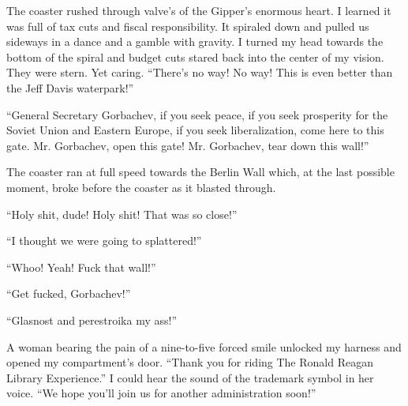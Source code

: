 \documentclass[12pt, oneside]{memoir}
\begin{document}
The coaster rushed through valve's of the Gipper's enormous heart.
I learned it was full of tax cuts and fiscal responsibility.
It spiraled down and pulled us sideways in a dance and a gamble with
gravity.
I turned my head towards the bottom of the spiral and budget cuts
stared back into the center of my vision.
They were stern. Yet caring.
``There's no way! No way! This is even better than the Jeff Davis
waterpark!'' 

``General Secretary Gorbachev, if you seek peace, if you seek
prosperity for the Soviet Union and Eastern Europe, if you seek
liberalization, come here to this gate.  Mr. Gorbachev, open this
gate! Mr. Gorbachev, tear down this wall!''

The coaster ran at full speed towards the Berlin Wall which, at the
last possible moment, broke before the coaster as it blasted through.

``Holy shit, dude! Holy shit! That was so close!''

``I thought we were going to splattered!''

``Whoo! Yeah! Fuck that wall!''

``Get fucked, Gorbachev!''

``Glasnost and perestroika my ass!''

A woman bearing the pain of a nine-to-five forced smile unlocked my
harness and opened my compartment's door.
``Thank you for riding The Ronald Reagan Library
Experience\texttrademark.''
I could hear the sound of the trademark symbol in her voice.
``We hope you'll join us for another administration soon!''




% 
\end{document}
